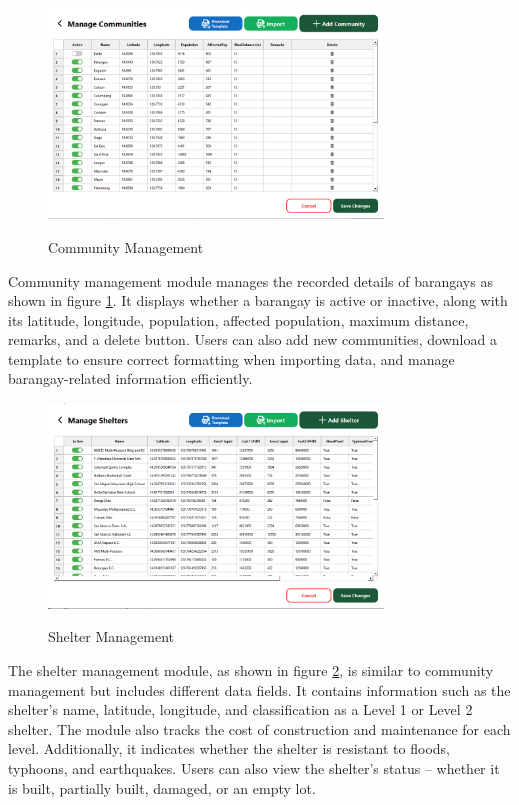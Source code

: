 	\begin{figure}[h!]
		\caption{Community Management}
		\centering
		\includegraphics[width=3.5in]{Chapter 4/commadvanced}
		\label{commMan}
	\end{figure}
	Community management module manages the recorded details of barangays as shown in figure \ref{commMan}. It displays whether a barangay is active or inactive, along with its latitude, longitude, population, affected population, maximum distance, remarks, and a delete button. Users can also add new communities, download a template to ensure correct formatting when importing data, and manage barangay-related information efficiently.
	
	\begin{figure}[h!]
		\caption{Shelter Management}
		\centering
		\includegraphics[width=3.5in]{Chapter 4/sheladvanced}
		\label{shelMan}
	\end{figure}
	The shelter management module, as shown in figure \ref{shelMan}, is similar to community management but includes different data fields. It contains information such as the shelter’s name, latitude, longitude, and classification as a Level 1 or Level 2 shelter. The module also tracks the cost of construction and maintenance for each level. Additionally, it indicates whether the shelter is resistant to floods, typhoons, and earthquakes. Users can also view the shelter’s status – whether it is built, partially built, damaged, or an empty lot.
	
